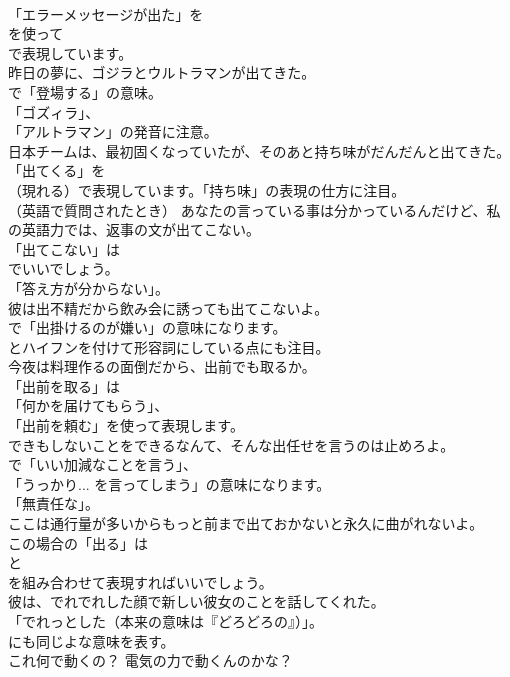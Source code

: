 \documentclass[8pt]{extreport}
\begin{document}
\begin{CJK}{UTF8}{min}
\\	「エラーメッセージが出た」を 
\\	を使って 
\\	で表現しています。	
\\	昨日の夢に、ゴジラとウルトラマンが出てきた。 
\\	で「登場する」の意味。
\\	「ゴズィラ」、
\\	「アルトラマン」の発音に注意。	
\\	日本チームは、最初固くなっていたが、そのあと持ち味がだんだんと出てきた。 
\\	「出てくる」を 
\\	（現れる）で表現しています。「持ち味」の表現の仕方に注目。	
\\	（英語で質問されたとき） あなたの言っている事は分かっているんだけど、私の英語力では、返事の文が出てこない。 
\\	「出てこない」は
\\	でいいでしょう。
\\	「答え方が分からない」。	
\\	彼は出不精だから飲み会に誘っても出てこないよ。 
\\	で「出掛けるのが嫌い」の意味になります。
\\	とハイフンを付けて形容詞にしている点にも注目。	
\\	今夜は料理作るの面倒だから、出前でも取るか。 
\\	「出前を取る」は
\\	「何かを届けてもらう」、
\\	「出前を頼む」を使って表現します。	
\\	できもしないことをできるなんて、そんな出任せを言うのは止めろよ。 
\\	で「いい加減なことを言う」、
\\	「うっかり... を言ってしまう」の意味になります。
\\	「無責任な」。	
\\	ここは通行量が多いからもっと前まで出ておかないと永久に曲がれないよ。 
\\	この場合の「出る」は 
\\	と 
\\	を組み合わせて表現すればいいでしょう。	
\\	彼は、でれでれした顔で新しい彼女のことを話してくれた。 
\\	「でれっとした（本来の意味は『どろどろの』）」。
\\	にも同じよな意味を表す。	
\\	これ何で動くの？ 電気の力で動くんのかな？ 

\end{CJK}
\end{document}
